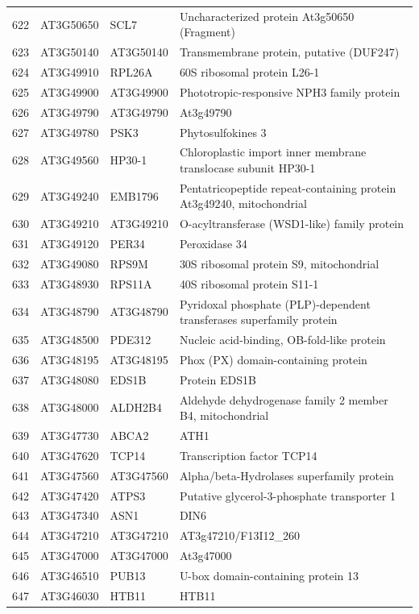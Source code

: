 \documentclass[11pt]{article}
\begin{document}
\begin{center}
\begin{tabular}{rlll}
622 & AT3G50650 & SCL7 & Uncharacterized protein At3g50650 (Fragment)\\
623 & AT3G50140 & AT3G50140 & Transmembrane protein, putative (DUF247)\\
624 & AT3G49910 & RPL26A & 60S ribosomal protein L26-1\\
625 & AT3G49900 & AT3G49900 & Phototropic-responsive NPH3 family protein\\
626 & AT3G49790 & AT3G49790 & At3g49790\\
627 & AT3G49780 & PSK3 & Phytosulfokines 3\\
628 & AT3G49560 & HP30-1 & Chloroplastic import inner membrane translocase subunit HP30-1\\
629 & AT3G49240 & EMB1796 & Pentatricopeptide repeat-containing protein At3g49240, mitochondrial\\
630 & AT3G49210 & AT3G49210 & O-acyltransferase (WSD1-like) family protein\\
631 & AT3G49120 & PER34 & Peroxidase 34\\
632 & AT3G49080 & RPS9M & 30S ribosomal protein S9, mitochondrial\\
633 & AT3G48930 & RPS11A & 40S ribosomal protein S11-1\\
634 & AT3G48790 & AT3G48790 & Pyridoxal phosphate (PLP)-dependent transferases superfamily protein\\
635 & AT3G48500 & PDE312 & Nucleic acid-binding, OB-fold-like protein\\
636 & AT3G48195 & AT3G48195 & Phox (PX) domain-containing protein\\
637 & AT3G48080 & EDS1B & Protein EDS1B\\
638 & AT3G48000 & ALDH2B4 & Aldehyde dehydrogenase family 2 member B4, mitochondrial\\
639 & AT3G47730 & ABCA2 & ATH1\\
640 & AT3G47620 & TCP14 & Transcription factor TCP14\\
641 & AT3G47560 & AT3G47560 & Alpha/beta-Hydrolases superfamily protein\\
642 & AT3G47420 & ATPS3 & Putative glycerol-3-phosphate transporter 1\\
643 & AT3G47340 & ASN1 & DIN6\\
644 & AT3G47210 & AT3G47210 & AT3g47210/F13I12\_260\\
645 & AT3G47000 & AT3G47000 & At3g47000\\
646 & AT3G46510 & PUB13 & U-box domain-containing protein 13\\
647 & AT3G46030 & HTB11 & HTB11\\

\end{tabular}
\end{center}
\end{document}
